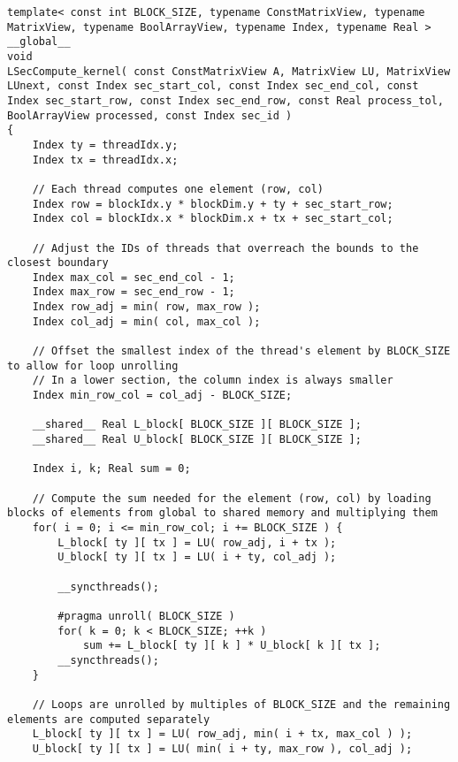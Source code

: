\begin{lstlisting}[caption={Implementation of the \code{LSecCompute\_kernel()} kernel which computes one iteration of a lower section.
Note that the matrices, vectors, and arrays are passed using their views, and the scalar values are copied to the local memory of each thread.},label={Listing:ICMxPP-implementation->kernels->lower-section-compute}]
template< const int BLOCK_SIZE, typename ConstMatrixView, typename MatrixView, typename BoolArrayView, typename Index, typename Real >
__global__
void
LSecCompute_kernel( const ConstMatrixView A, MatrixView LU, MatrixView LUnext, const Index sec_start_col, const Index sec_end_col, const Index sec_start_row, const Index sec_end_row, const Real process_tol, BoolArrayView processed, const Index sec_id )
{
	Index ty = threadIdx.y;
	Index tx = threadIdx.x;
	
	// Each thread computes one element (row, col)
	Index row = blockIdx.y * blockDim.y + ty + sec_start_row;
	Index col = blockIdx.x * blockDim.x + tx + sec_start_col;
	
	// Adjust the IDs of threads that overreach the bounds to the closest boundary
	Index max_col = sec_end_col - 1;
	Index max_row = sec_end_row - 1;
	Index row_adj = min( row, max_row );
	Index col_adj = min( col, max_col );
	
	// Offset the smallest index of the thread's element by BLOCK_SIZE to allow for loop unrolling
	// In a lower section, the column index is always smaller
	Index min_row_col = col_adj - BLOCK_SIZE;
	
	__shared__ Real L_block[ BLOCK_SIZE ][ BLOCK_SIZE ];
	__shared__ Real U_block[ BLOCK_SIZE ][ BLOCK_SIZE ];
	
	Index i, k; Real sum = 0;
	
	// Compute the sum needed for the element (row, col) by loading blocks of elements from global to shared memory and multiplying them
	for( i = 0; i <= min_row_col; i += BLOCK_SIZE ) {
		L_block[ ty ][ tx ] = LU( row_adj, i + tx );
		U_block[ ty ][ tx ] = LU( i + ty, col_adj );
		
		__syncthreads();
		
		#pragma unroll( BLOCK_SIZE )
		for( k = 0; k < BLOCK_SIZE; ++k )
			sum += L_block[ ty ][ k ] * U_block[ k ][ tx ];
		__syncthreads();
	}
	
	// Loops are unrolled by multiples of BLOCK_SIZE and the remaining elements are computed separately
	L_block[ ty ][ tx ] = LU( row_adj, min( i + tx, max_col ) );
	U_block[ ty ][ tx ] = LU( min( i + ty, max_row ), col_adj );
	

\end{lstlisting}
